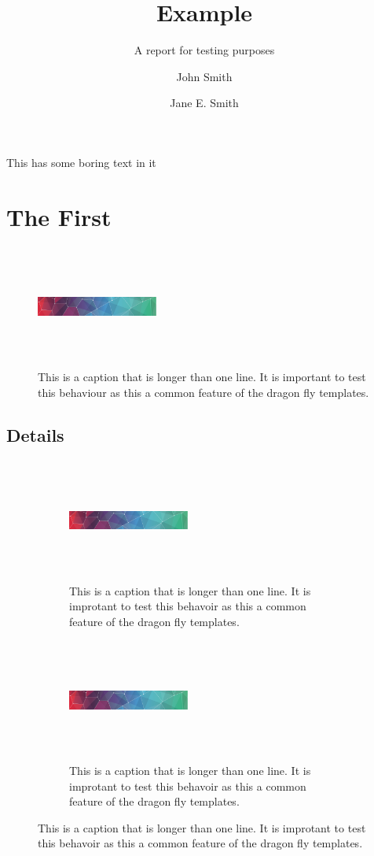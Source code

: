 \documentclass{dragonfly-proposal}
\title{Example}{An Example\\ Report about \emph{sheep}}
\subtitle{A report for testing purposes}
\author{John Smith \and Jane E. Smith}
\begin{document}
\maketitle

\summary%
This has some boring text in it

\section{The First}
\lipsum[1]


\begin{figure}[h]
  \includegraphics[width=40mm,height=40mm]{pattern}
  \caption{This is a caption that is longer than one line. It is important to test 
  this behaviour as this a common feature of the dragon fly templates.}
\end{figure}

\subsection{Details}

\lipsum[2]


\begin{figure}[h]

  \begin{subfigure}{0.45\textwidth}
  \includegraphics[width=40mm,height=40mm]{pattern}
  \caption{This is a caption that is longer than one line. It is improtant to test 
  this behavoir as this a common feature of the dragon fly templates.}
\end{subfigure}\qquad
  \begin{subfigure}{0.45\textwidth}
  \includegraphics[width=40mm,height=40mm]{pattern}
  \caption{This is a caption that is longer than one line. It is improtant to test 
  this behavoir as this a common feature of the dragon fly templates.}
\end{subfigure}
\end{figure}
\end{document}

